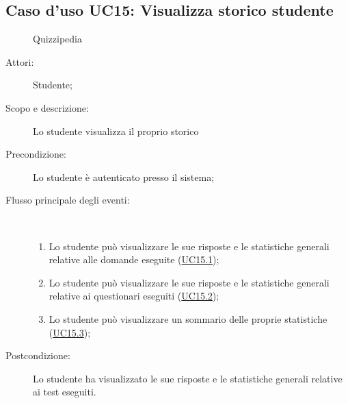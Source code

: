 \subsection{Caso d'uso UC15: Visualizza storico studente}
	\begin{figure}[H]
		\centering
		\begin{resizedtikzpicture}{\textwidth}
		\begin{umlsystem}[x=0, fill=lightgray!20]{Quizzipedia}
		\end{umlsystem}
		\end{resizedtikzpicture}
		\caption{}
	\end{figure}
\begin{description}
\item[Attori:] Studente;
\item[Scopo e descrizione:] Lo studente visualizza il proprio storico
      \item[Precondizione:] Lo studente è autenticato presso il sistema;

        \item[Flusso principale degli eventi:] \ 
 \begin{enumerate}
          \item Lo studente può visualizzare le sue risposte e le statistiche generali relative alle domande eseguite (\hyperlink{UC15.1}{UC15.1});
          \item Lo studente può visualizzare le sue risposte e le statistiche generali relative ai questionari eseguiti (\hyperlink{UC15.2}{UC15.2});
          \item Lo studente può visualizzare un sommario delle proprie statistiche (\hyperlink{UC15.3}{UC15.3});

      \end{enumerate}
    \item[Postcondizione:] Lo studente ha visualizzato le sue risposte e le statistiche generali relative ai test eseguiti.
  \end{description}
\hypertarget{UC15.1}{}
